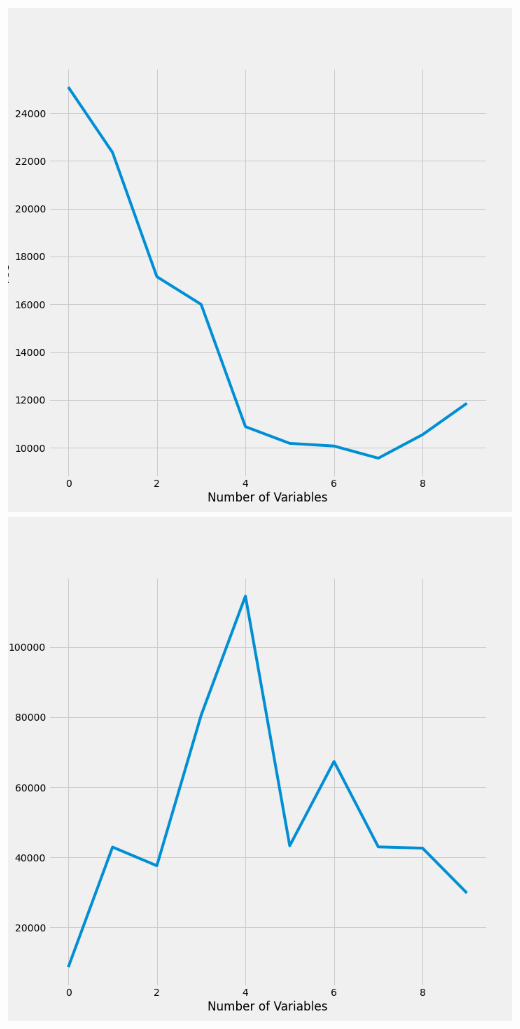 \documentclass{article}
\begin{document}
	\includegraphics[scale = 0.2]{../plots/python/AICAutoForward3L.png} 
	\includegraphics[scale = 0.2]{../plots/python/AICBackward3L.png}
\end{document}

